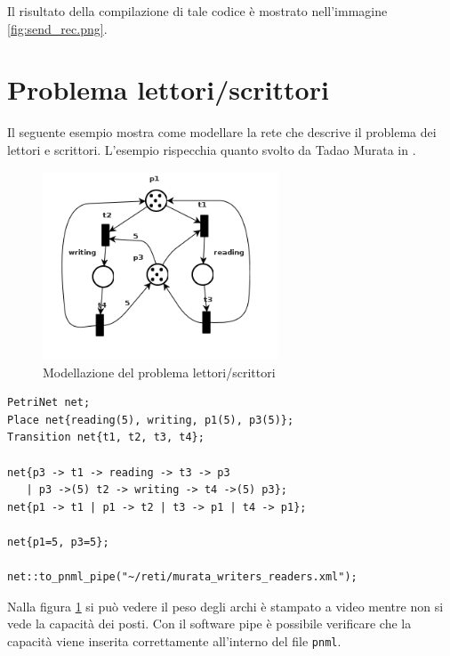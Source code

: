 \documentclass[italian,12pt]{book}
\begin{document}
Il risultato della compilazione di tale codice è mostrato nell'immagine \ref{fig:send_rec.png}.

\section{Problema lettori/scrittori}
Il seguente esempio mostra come modellare la rete che descrive il problema dei lettori e scrittori. L'esempio rispecchia quanto svolto da Tadao Murata in \cite{MURATA}.

\begin{figure}[htb]
\centerline{\includegraphics[width=7cm]{img/murata_writers_readers.png}}
\caption{Modellazione del problema lettori/scrittori}\label{fig:let_scrit.png}
\end{figure}

\begin{verbatim}PetriNet net;
Place net{reading(5), writing, p1(5), p3(5)};
Transition net{t1, t2, t3, t4};

net{p3 -> t1 -> reading -> t3 -> p3 
   | p3 ->(5) t2 -> writing -> t4 ->(5) p3};
net{p1 -> t1 | p1 -> t2 | t3 -> p1 | t4 -> p1};

net{p1=5, p3=5};

net::to_pnml_pipe("~/reti/murata_writers_readers.xml");
\end{verbatim}

Nalla figura \ref{fig:let_scrit.png} si può vedere il peso degli archi è stampato a video mentre non si vede la capacità dei posti. Con il software pipe è possibile verificare che la capacità viene inserita correttamente all'interno del file {\tt pnml}.

%


\end{document}
